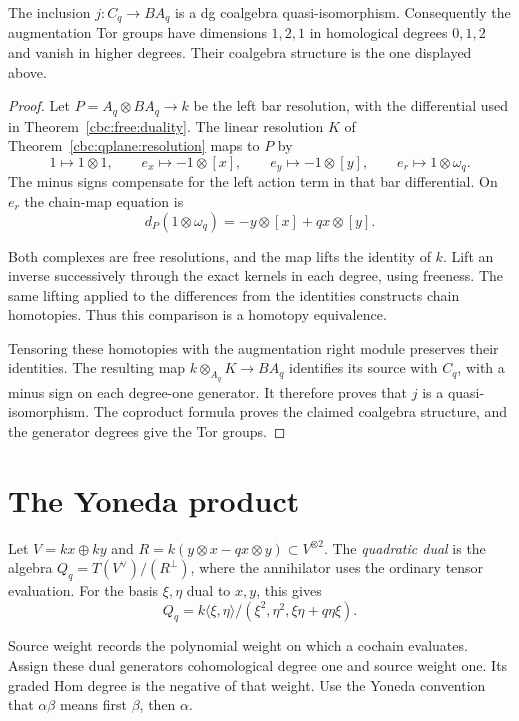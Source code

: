 \begin{proposition}\label{cbc:qplane:coalgebra}
The inclusion $j:C_q\longrightarrow BA_q$ is a dg coalgebra quasi-isomorphism.
Consequently the augmentation Tor groups have dimensions $1,2,1$ in homological degrees $0,1,2$ and vanish in higher degrees.
Their coalgebra structure is the one displayed above.
\end{proposition}
\begin{proof}
Let $P=A_q\otimes BA_q\to k$ be the left bar resolution, with the differential used in Theorem~\ref{cbc:free:duality}.
The linear resolution $K$ of Theorem~\ref{cbc:qplane:resolution} maps to $P$ by
\[
 1\longmapsto1\otimes1,\qquad
 e_x\longmapsto-1\otimes[x],\qquad
 e_y\longmapsto-1\otimes[y],\qquad
 e_r\longmapsto1\otimes\omega_q.
\]
The minus signs compensate for the left action term in that bar differential.
On $e_r$ the chain-map equation is
\[
 d_P(1\otimes\omega_q)=-y\otimes[x]+qx\otimes[y].
\]

Both complexes are free resolutions, and the map lifts the identity of $k$.
Lift an inverse successively through the exact kernels in each degree, using freeness.
The same lifting applied to the differences from the identities constructs chain homotopies.
Thus this comparison is a homotopy equivalence.

Tensoring these homotopies with the augmentation right module preserves their identities.
The resulting map $k\otimes_{A_q}K\to BA_q$ identifies its source with $C_q$, with a minus sign on each degree-one generator.
It therefore proves that $j$ is a quasi-isomorphism.
The coproduct formula proves the claimed coalgebra structure, and the generator degrees give the Tor groups.
\end{proof}

\section{The Yoneda product}

Let $V=kx\oplus ky$ and $R=k(y\otimes x-qx\otimes y)\subset V^{\otimes2}$.
The \emph{quadratic dual} is the algebra $Q_q=T(V^\vee)/(R^\perp)$, where the annihilator uses the ordinary tensor evaluation.
For the basis $\xi,\eta$ dual to $x,y$, this gives
\[
 Q_q=k\langle\xi,\eta\rangle/
       (\xi^2,\eta^2,\xi\eta+q\eta\xi).
\]

Source weight records the polynomial weight on which a cochain evaluates.
Assign these dual generators cohomological degree one and source weight one.
Its graded Hom degree is the negative of that weight.
Use the Yoneda convention that $\alpha\beta$ means first $\beta$, then $\alpha$.

